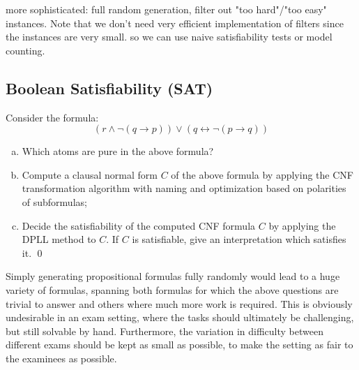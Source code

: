 more sophisticated: full random generation, filter out "too hard"/"too easy" instances.
Note that we don't need very efficient implementation of filters since the instances are very small.
so we can use naive satisfiability tests or model counting.

\subsection{Boolean Satisfiability (SAT)}

\begin{mdframed}
    \begin{example}
        Consider the formula:
        \[
            ( r \land \lnot ( q \rightarrow p ) ) \lor ( q \leftrightarrow \lnot ( p \rightarrow q ) )
        \]
        \begin{enumerate}[(a)]
            \item
                Which atoms are pure in the above formula?
            \item\label{subtask:sat-cnf}
                Compute a clausal normal form $C$ of the above formula by
                applying the CNF transformation algorithm with naming and
                optimization based on polarities of subformulas;
            \item
                Decide the satisfiability of the computed CNF formula $C$
                by applying the DPLL method to $C$. If $C$ is
                satisfiable, give an interpretation which
                satisfies it.
                \qed
        \end{enumerate}
    \end{example}
\end{mdframed}


Simply generating propositional formulas fully randomly would lead
to a huge variety of formulas,
spanning both formulas for which the above questions are trivial to answer
and others where much more work is required.
This is obviously undesirable in an exam setting,
where the tasks should ultimately be challenging, but still solvable by hand.
Furthermore,
the variation in difficulty between different exams should be kept as small as possible,
to make the setting as fair to the examinees as possible.

